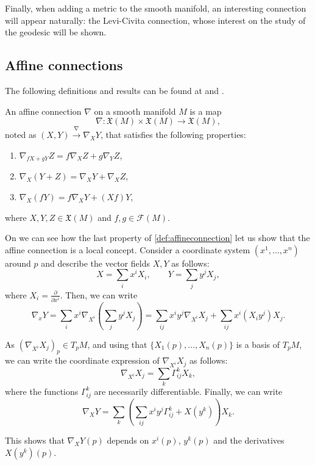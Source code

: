 Finally, when adding a metric to the smooth manifold, an interesting connection will appear naturally: the Levi-Civita connection, whose interest on the study of the geodesic will be shown.

\subsection{Affine connections}

The following definitions and results can be found at \cite[Ch. 2, Section 2]{docarmo79} and \cite[pp. 59-67]{oneill83}.

\begin{definition}
	\label{def:affineconnection}
	An affine connection $\nabla$ on a smooth manifold $M$ is a map
	\[
		\nabla \colon \mathfrak{X}(M) \times \mathfrak{X}(M) \to \mathfrak{X}(M),
	\]
	noted as $(X, Y) \xrightarrow{\nabla}\nabla_X Y$, that satisfies the following properties:
	\begin{enumerate}
		\item $\nabla_{fX + gY} Z = f\nabla_X Z + g\nabla_Y Z$,
		\item $\nabla_X(Y+Z) = \nabla_X Y + \nabla_X Z$,
		\item $\nabla_X (fY) = f\nabla_XY + (Xf) Y$,
	\end{enumerate}
	where $X,Y,Z \in \mathfrak{X}(M)$ and $f,g \in \mathcal{F}(M)$.
\end{definition}

On \cite[Chapter 2, Remark 2.3]{docarmo79} we can see how the last property of \autoref{def:affineconnection} let us show that the affine connection is a local concept. Consider a coordinate system $(x^1, \dots, x^n)$ around $p$ and describe the vector fields $X, Y$ as follows:
\[
X = \sum_i x^i X_i, \qquad Y = \sum_j y^j X_j,
\]
where $X_i = \frac{\partial}{\partial x^i}$. Then, we can write
\[
\nabla_x Y = \sum_i x^i \nabla_{X^i}\left(\sum_j y^j X_j \right) = \sum_{ij} x^i y^j \nabla_{X^i} X_j + \sum_{ij} x^i (X_i y^j) X_j.
\]

As $(\nabla_{X^i} X_j)_p \in T_p M$, and using that $\{X_1(p), \dots, X_n(p)\}$ is a basis of $T_p M$, we can write the coordinate expression of $\nabla_{X^i} X_j$ as follows:
\[
	\nabla_{X^i} X_j = \sum_k \Gamma^k_{ij} X_k,
\]
where the functions $\Gamma^k_{ij}$ are necessarily differentiable. Finally, we can write
\[
\nabla_X Y = \sum_k \left( \sum_{ij} x^i y^j \Gamma^k_{ij} + X(y^k) \right) X_k.
\]

This shows that $\nabla_X Y(p)$ depends on $x^i(p)$, $y^k(p)$ and the derivatives $X(y^k)(p)$.

